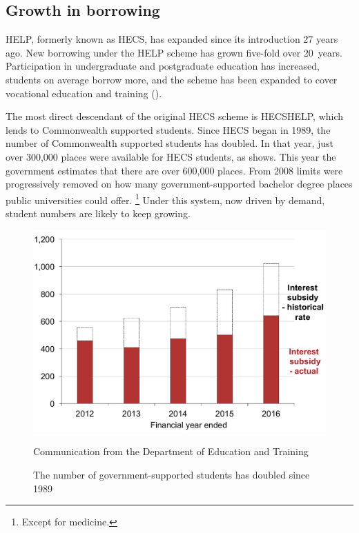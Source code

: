 \documentclass[embargoed]{grattan}
\begin{document}
\subsection{Growth in borrowing}\label{subsec:growth-in-borrowing} 

\gls{HELP}, formerly known as \gls{HECS}, has expanded since its introduction 27 years ago.
New borrowing under the \gls{HELP} scheme has grown five-fold over 20~years. Participation in undergraduate and postgraduate education has increased, students on average borrow more, and the scheme has been expanded to cover vocational education and training ().

The most direct descendant of the original \gls{HECS} scheme is \gls{HECSHELP}, which lends to \gls{Commonwealth supported} students.
Since \gls{HECS} began in 1989, the number of \gls{Commonwealth supported} students has doubled.
In that year, just over 300,000 places were available for \gls{HECS} students, as  shows.
This year the government estimates that there are over 600,000 places.
From 2008 limits were progressively removed on how many government-supported bachelor degree places public universities could offer.%
\footnote{Except for medicine.} 
Under this system, now driven by demand, student numbers are likely to keep growing.

\begin{figure}[t]\vspace{1pt}
\caption{The number of government-supported students has doubled since 1989}\label{fig:fig3-number-govt-supported-students-doubled-since-1989}

\includegraphics[page=3]{atlas/Chartpack.pdf}

%
{Communication from the Department of Education and Training}

\end{figure}
\end{document}
